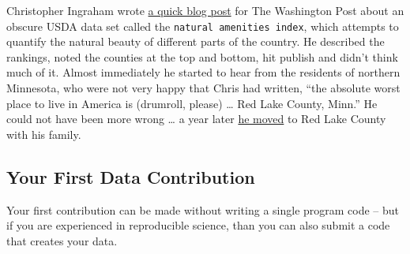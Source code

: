 \documentclass[
  a4paper,
  openany, a4paper, oneside]{book}
\begin{document}
\begin{itemize}
  Christopher Ingraham wrote \href{https://www.washingtonpost.com/gdpr-consent/?next_url=https\%3a\%2f\%2fwww.washingtonpost.com\%2fnews\%2fwonk\%2fwp\%2f2015\%2f08\%2f17\%2fevery-county-in-america-ranked-by-natural-beauty\%2f}{a quick blog post} for The Washington Post about an obscure USDA data set called the \texttt{natural\ amenities\ index}, which attempts to quantify the natural beauty of different parts of the country. He described the rankings, noted the counties at the top and bottom, hit publish and didn't think much of it. Almost immediately he started to hear from the residents of northern Minnesota, who were not very happy that Chris had written, ``the absolute worst place to live in America is (drumroll, please) \ldots{} Red Lake County, Minn.'' He could not have been more wrong \ldots{} a year later \href{https://fivethirtyeight.com/features/he-called-it-americas-worst-place-to-live-now-hes-moving-there/}{he moved} to Red Lake County with his family.
\end{itemize}

\hypertarget{first-contribution}{%
\subsection{Your First Data Contribution}\label{first-contribution}}

Your first contribution can be made without writing a single program code -- but if you are experienced in reproducible science, than you can also submit a code that creates your data.
\end{document}

